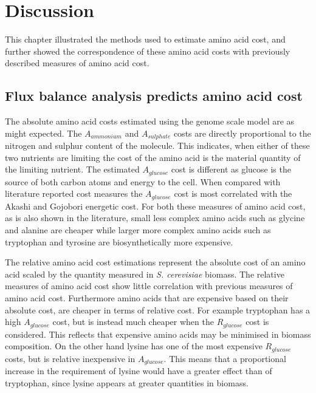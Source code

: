 \clearpage

\section{Discussion}%

This chapter illustrated the methods used to estimate amino acid cost, and further showed the correspondence of these amino acid costs with previously described measures of amino acid cost.

\subsection{Flux balance analysis predicts amino acid cost}%

The absolute amino acid costs estimated using the genome scale model are as might expected. The $A_{ammonium}$ and $A_{sulphate}$ costs are directly proportional to the nitrogen and sulphur content of the molecule. This indicates, when either of these two nutrients are limiting the cost of the amino acid is the material quantity of the limiting nutrient. The estimated $A_{glucose}$ cost is different as glucose is the source of both carbon atoms and energy to the cell. When compared with literature reported cost measures the $A_{glucose}$ cost is most correlated with the Akashi and Gojobori energetic cost. For both these measures of amino acid cost, as is also shown in the literature, small less complex amino acids such as glycine and alanine are cheaper while larger more complex amino acids such as tryptophan and tyrosine are biosynthetically more expensive.

The relative amino acid cost estimations represent the absolute cost of an amino acid scaled by the quantity measured in \emph{S. cerevisiae} biomass. The relative measures of amino acid cost show little correlation with previous measures of amino acid cost. Furthermore amino acids that are expensive based on their absolute cost, are cheaper in terms of relative cost. For example tryptophan has a high $A_{glucose}$ cost, but is instead much cheaper when the $R_{glucose}$ cost is considered. This reflects that expensive amino acids may be minimised in biomass composition. On the other hand lysine has one of the most expensive $R_{glucose}$ costs, but is relative inexpensive in $A_{glucose}$. This means that a proportional increase in the requirement of lysine would have a greater effect than of tryptophan, since lysine appears at greater quantities in biomass.

